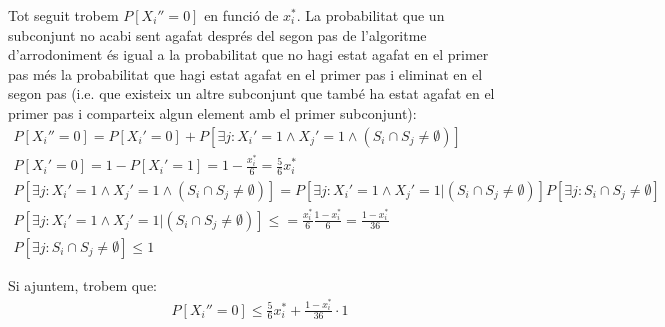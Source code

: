 \documentclass[a4paper]{article}
\begin{document}
Tot seguit trobem $P[X_i'' = 0]$ en funció de $x_i^*$. La probabilitat que un subconjunt no acabi sent agafat després del segon pas de l'algoritme d'arrodoniment és igual a la probabilitat que no hagi estat agafat en el primer pas més la probabilitat que hagi estat agafat en el primer pas i eliminat en el segon pas (i.e. que existeix un altre subconjunt que també ha estat agafat en el primer pas i comparteix algun element amb el primer subconjunt):
\begin{gather*}
	P[X_i'' = 0] = P[X_i'=0] + P[\exists j : X_i'=1 \land X_j'=1 \land (S_i \cap S_j \neq \emptyset)] \\
	P[X_i'=0] = 1 - P[X_i'=1] = 1 - \frac{x_i^*}{6} = \frac{5}{6} x_i^* \\
	P[\exists j : X_i'=1 \land X_j'=1 \land (S_i \cap S_j \neq \emptyset)] = P[\exists j : X_i'=1 \land X_j'=1 | (S_i \cap S_j \neq \emptyset)] P[\exists j : S_i \cap S_j \neq \emptyset] \\
	P[\exists j : X_i'=1 \land X_j'=1 | (S_i \cap S_j \neq \emptyset)] \leq = \frac{x_i^*}{6} \frac{1 - x_i^*}{6} = \frac{1 - x_i^*}{36} \\
	P[\exists j : S_i \cap S_j \neq \emptyset] \leq 1
\end{gather*}

Si ajuntem, trobem que:
\begin{gather*}
	P[X_i'' = 0] \leq \frac{5}{6} x_i^* + \frac{1 - x_i^*}{36} \cdot 1
\end{gather*}
\end{document}
